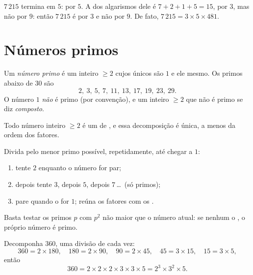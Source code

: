 \begin{example}
$7\,215$ termina em $5$:  por $5$. A  dos algarismos dele
é $7 + 2 + 1 + 5 = 15$,  por $3$, mas não por $9$: então
$7\,215$ é  por $3$ e não por $9$. De fato,
$7\,215 = 3 \times 5 \times 481$.
\end{example}

\section{Números primos}

\begin{definition}\label{def:g9:arith:prime}
Um \emph{número primo} é um inteiro $\geq 2$ cujos
únicos  são $1$ e ele mesmo. Os primos abaixo de $30$ são
\[
2,\ 3,\ 5,\ 7,\ 11,\ 13,\ 17,\ 19,\ 23,\ 29 .
\]
O número $1$ \emph{não} é primo (por convenção), e um inteiro $\geq 2$
que não é primo se diz \emph{composto}.
\end{definition}

\begin{theorem}\label{thm:g9:arith:factorization}
Todo número inteiro $\geq 2$ é um  de , e essa
decomposição é única, a menos da ordem dos fatores.
\end{theorem}
\admitted

\begin{method}\label{met:g9:arith:factorization}
Divida pelo menor primo possível, repetidamente, até chegar a $1$:
\begin{enumerate}
  \item tente $2$ enquanto o número for par;
  \item depois tente $3$, depois $5$, depois $7$\,\dots\ (só primos);
  \item pare quando o  for $1$; reúna os fatores com os
        .
\end{enumerate}
Basta testar os primos $p$ com $p^2$ não maior que o número atual: se
nenhum o , o próprio número é primo.
\end{method}

\begin{example}\label{ex:g9:arith:factorization}
Decomponha $360$, uma divisão de cada vez:
\[
360 = 2 \times 180, \quad
180 = 2 \times 90, \quad
90 = 2 \times 45, \quad
45 = 3 \times 15, \quad
15 = 3 \times 5,
\]
então
\[
360 = 2 \times 2 \times 2 \times 3 \times 3 \times 5 = 2^3 \times 3^2
\times 5 .
\]
\end{example}

